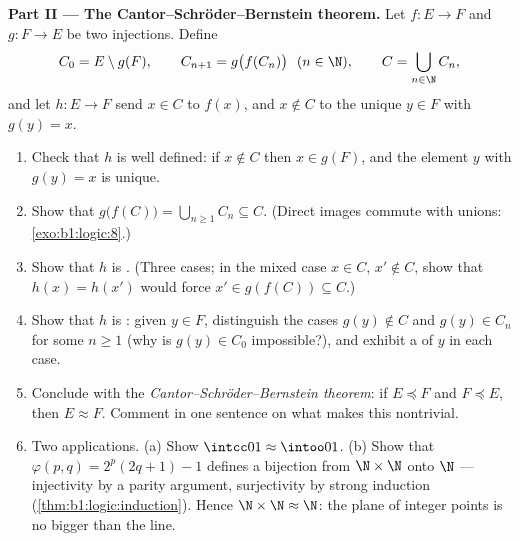 \begin{problem}
\medskip
\noindent\textbf{Part II --- The Cantor--Schr\"oder--Bernstein
theorem.} Let $f \colon E \to F$ and $g \colon F \to E$ be two
injections. Define
\[
C_0 = E \setminus g(F), \qquad C_{n+1} = g\bigl(f(C_n)\bigr)
\ \ (n \in \N), \qquad C = \bigcup_{n \in \N} C_n,
\]
and let $h \colon E \to F$ send $x \in C$ to $f(x)$, and $x \notin C$
to the unique $y \in F$ with $g(y) = x$.
\begin{enumerate}[resume]
  \item Check that $h$ is well defined: if $x \notin C$ then $x \in
        g(F)$, and the element $y$ with $g(y) = x$ is unique.
  \item Show that $g\bigl(f(C)\bigr) = \bigcup_{n \geq 1} C_n
        \subseteq C$. (Direct images commute with unions:
        \cref{exo:b1:logic:8}.)
  \item Show that $h$ is . (Three cases; in the mixed case
        $x \in C$, $x' \notin C$, show that $h(x) = h(x')$ would
        force $x' \in g(f(C)) \subseteq C$.)
  \item Show that $h$ is : given $y \in F$, distinguish
        the cases $g(y) \notin C$ and $g(y) \in C_n$ for some $n
        \geq 1$ (why is $g(y) \in C_0$ impossible?), and exhibit a
         of $y$ in each case.
  \item Conclude with the \emph{Cantor--Schr\"oder--Bernstein
        theorem}: if $E \preceq F$ and $F \preceq E$, then $E
        \approx F$. Comment in one sentence on what makes this
         nontrivial.
  \item Two applications. (a) Show $\intcc01 \approx \intoo01$.
        (b) Show that $\varphi(p, q) = 2^p(2q + 1) - 1$ defines a
        bijection from $\N \times \N$ onto $\N$ --- injectivity by a
        parity argument, surjectivity by strong induction
        (\cref{thm:b1:logic:induction}). Hence $\N \times \N \approx
        \N$: the plane of integer points is no bigger than the
        line.
\end{enumerate}


\end{problem}

